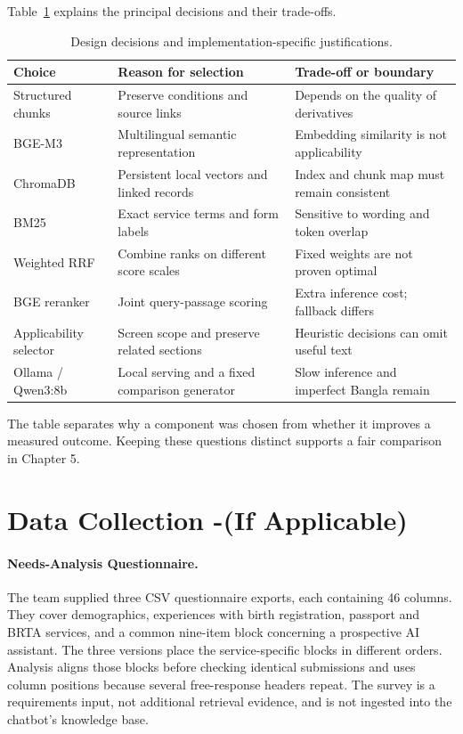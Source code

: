 Table~\ref{tab:design-decisions} explains the principal decisions and their trade-offs.
\begin{table}[htbp]\centering\small
\caption{Design decisions and implementation-specific justifications.}\label{tab:design-decisions}
\begin{tabularx}{\linewidth}{p{27mm}XX}\toprule
Choice & Reason for selection & Trade-off or boundary\\\midrule
Structured chunks & Preserve conditions and source links & Depends on the quality of derivatives\\
BGE-M3 & Multilingual semantic representation & Embedding similarity is not applicability\\
ChromaDB & Persistent local vectors and linked records & Index and chunk map must remain consistent\\
BM25 & Exact service terms and form labels & Sensitive to wording and token overlap\\
Weighted RRF & Combine ranks on different score scales & Fixed weights are not proven optimal\\
BGE reranker & Joint query-passage scoring & Extra inference cost; fallback differs\\
Applicability selector & Screen scope and preserve related sections & Heuristic decisions can omit useful text\\
Ollama / Qwen3:8b & Local serving and a fixed comparison generator & Slow inference and imperfect Bangla remain\\\bottomrule
\end{tabularx}\end{table}
The table separates why a component was chosen from whether it improves a measured outcome. Keeping these questions distinct supports a fair comparison in Chapter 5.

\section{Data Collection -(If
Applicable)}
\paragraph{Needs-Analysis Questionnaire.}
The team supplied three CSV questionnaire exports, each containing 46 columns. They cover demographics, experiences with birth registration, passport and BRTA services, and a common nine-item block concerning a prospective AI assistant. The three versions place the service-specific blocks in different orders. Analysis aligns those blocks before checking identical submissions and uses column positions because several free-response headers repeat. The survey is a requirements input, not additional retrieval evidence, and is not ingested into the chatbot's knowledge base.

